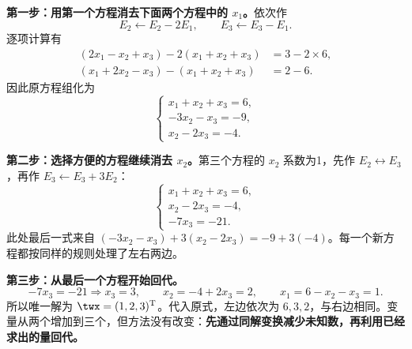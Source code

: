 \documentclass[a4paper,12pt,twoside,openany,fontset=none]{ctexbook}
\numberwithin{equation}{chapter}
\begin{document}
\textbf{第一步：用第一个方程消去下面两个方程中的 $x_1$。}依次作
\[
 E_2\leftarrow E_2-2E_1,\qquad E_3\leftarrow E_3-E_1.
\]
逐项计算有
\[
\begin{aligned}
 (2x_1-x_2+x_3)-2(x_1+x_2+x_3)&=3-2\times6,\\
 (x_1+2x_2-x_3)-(x_1+x_2+x_3)&=2-6.
\end{aligned}
\]
因此原方程组化为
\[
    \begin{cases}
        x_1+x_2+x_3=6,\\
        -3x_2-x_3=-9,\\
        x_2-2x_3=-4.
    \end{cases}
\]

\textbf{第二步：选择方便的方程继续消去 $x_2$。}第三个方程的 $x_2$ 系数为1，先作 $E_2\leftrightarrow E_3$，再作 $E_3\leftarrow E_3+3E_2$：
\begin{equation}
\label{eq:two-main-echelon}
    \begin{cases}
        x_1+x_2+x_3=6,\\
        x_2-2x_3=-4,\\
        -7x_3=-21.
    \end{cases}
\end{equation}
此处最后一式来自 $(-3x_2-x_3)+3(x_2-2x_3)=-9+3(-4)$。每一个新方程都按同样的规则处理了左右两边。

\textbf{第三步：从最后一个方程开始回代。}
\[
    -7x_3=-21\Rightarrow x_3=3,
    \qquad x_2=-4+2x_3=2,
    \qquad x_1=6-x_2-x_3=1.
\]
所以唯一解为 $\twx=(1,2,3)^{\mathrm T}$。代入原式，左边依次为 $6,3,2$，与右边相同。变量从两个增加到三个，但方法没有改变：\textbf{先通过同解变换减少未知数，再利用已经求出的量回代。}
\end{document}
